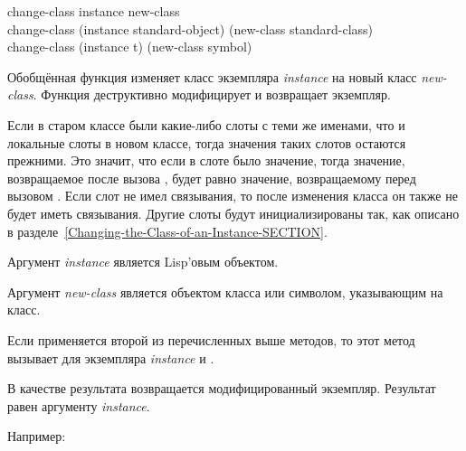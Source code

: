 \begin{defun}
change-class instance new-class \\
change-class (instance standard-object) (new-class standard-class) \\
change-class (instance t) (new-class symbol)

Обобщённая функция  изменяет класс экземпляра \emph{instance}
на новый класс \emph{new-class}. Функция деструктивно модифицирует и возвращает
экземпляр.

Если в старом классе были какие-либо слоты с теми же именами, что и локальные
слоты в новом классе, тогда значения таких слотов остаются прежними. Это значит,
что если в слоте было значение, тогда значение, возвращаемое 
после вызова , будет равно  значение, возвращаемому
 перед вызовом . Если слот не имел связывания,
то после изменения класса он также не будет иметь связывания. Другие слоты будут
инициализированы так, как описано в
разделе~\ref{Changing-the-Class-of-an-Instance-SECTION}.

Аргумент \emph{instance} является Lisp'овым объектом.

Аргумент \emph{new-class} является объектом класса или символом, указывающим на
класс.

Если применяется второй из перечисленных выше методов, то этот метод вызывает
 для экземпляра \emph{instance} и .

В качестве результата возвращается модифицированный экземпляр. Результат
 равен  аргументу \emph{instance}.

Например:


\end{defun}
